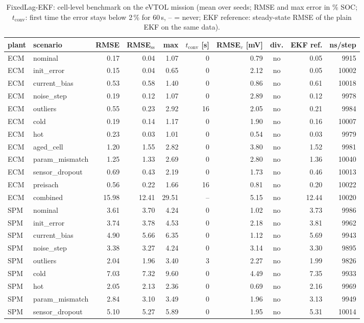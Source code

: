 \begin{table}[H]\centering\footnotesize\setlength{\tabcolsep}{4pt}
\caption{FixedLag-EKF: cell-level benchmark on the eVTOL mission (mean over seeds; RMSE and max error in \% SOC; $t_\mathrm{conv}$: first time the error stays below 2\,\% for 60\,s, -- = never; EKF reference: steady-state RMSE of the plain EKF on the same data).}\label{tab:cell_FixedLagEKF}
\begin{tabular}{llrrrrrcrr}\toprule
plant & scenario & RMSE & RMSE$_\mathrm{ss}$ & max & $t_\mathrm{conv}$ [s] & RMSE$_v$ [mV] & div. & EKF ref. & ns/step \\ \midrule
ECM & nominal & 0.17 & 0.04 & 1.07 & 0 & 0.79 & no & 0.05 & 9915 \\
ECM & init\_error & 0.15 & 0.04 & 0.65 & 0 & 2.12 & no & 0.05 & 10002 \\
ECM & current\_bias & 0.53 & 0.58 & 1.40 & 0 & 0.86 & no & 0.61 & 10018 \\
ECM & noise\_step & 0.19 & 0.12 & 1.07 & 0 & 2.89 & no & 0.12 & 9978 \\
ECM & outliers & 0.55 & 0.23 & 2.92 & 16 & 2.05 & no & 0.21 & 9984 \\
ECM & cold & 0.19 & 0.14 & 1.17 & 0 & 1.90 & no & 0.16 & 10007 \\
ECM & hot & 0.23 & 0.03 & 1.01 & 0 & 0.54 & no & 0.03 & 9979 \\
ECM & aged\_cell & 1.20 & 1.55 & 2.82 & 0 & 3.80 & no & 1.52 & 9981 \\
ECM & param\_mismatch & 1.25 & 1.33 & 2.69 & 0 & 2.80 & no & 1.36 & 10040 \\
ECM & sensor\_dropout & 0.69 & 0.43 & 2.19 & 0 & 1.73 & no & 0.46 & 10013 \\
ECM & preisach & 0.56 & 0.22 & 1.66 & 16 & 0.81 & no & 0.20 & 10022 \\
ECM & combined & 15.98 & 12.41 & 29.51 & -- & 5.15 & no & 12.44 & 10020 \\
\midrule
SPM & nominal & 3.61 & 3.70 & 4.24 & 0 & 1.02 & no & 3.73 & 9986 \\
SPM & init\_error & 3.74 & 3.78 & 4.53 & 0 & 2.18 & no & 3.81 & 9962 \\
SPM & current\_bias & 4.90 & 5.66 & 6.35 & 0 & 1.12 & no & 5.69 & 9943 \\
SPM & noise\_step & 3.38 & 3.27 & 4.24 & 0 & 3.14 & no & 3.30 & 9895 \\
SPM & outliers & 2.04 & 1.96 & 3.40 & 3 & 2.27 & no & 1.99 & 9826 \\
SPM & cold & 7.03 & 7.32 & 9.60 & 0 & 4.49 & no & 7.35 & 9933 \\
SPM & hot & 2.05 & 2.13 & 2.36 & 0 & 0.69 & no & 2.16 & 9969 \\
SPM & param\_mismatch & 2.84 & 3.10 & 3.49 & 0 & 1.96 & no & 3.13 & 9949 \\
SPM & sensor\_dropout & 5.10 & 5.27 & 5.89 & 0 & 1.95 & no & 5.31 & 10014 \\
\bottomrule\end{tabular}\end{table}
